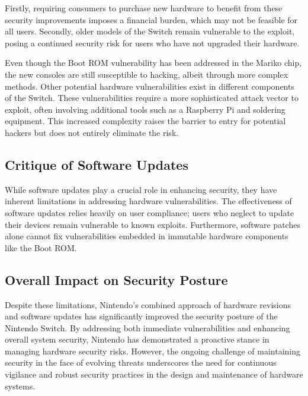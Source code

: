 Firstly, requiring consumers to purchase new hardware to benefit from these security improvements imposes a financial burden, which may not be feasible for all users. Secondly, older models of the Switch remain vulnerable to the exploit, posing a continued security risk for users who have not upgraded their hardware.

Even though the Boot ROM vulnerability has been addressed in the Mariko chip, the new consoles are still susceptible to hacking, albeit through more complex methods. Other potential hardware vulnerabilities exist in different components of the Switch. These vulnerabilities require a more sophisticated attack vector to exploit, often involving additional tools such as a Raspberry Pi and soldering equipment. This increased complexity raises the barrier to entry for potential hackers but does not entirely eliminate the risk.


\subsection{Critique of Software Updates}
While software updates play a crucial role in enhancing security, they have inherent limitations in addressing hardware vulnerabilities. The effectiveness of software updates relies heavily on user compliance; users who neglect to update their devices remain vulnerable to known exploits. Furthermore, software patches alone cannot fix vulnerabilities embedded in immutable hardware components like the Boot ROM.
\subsection{Overall Impact on Security Posture}
Despite these limitations, Nintendo's combined approach of hardware revisions and software updates has significantly improved the security posture of the Nintendo Switch. By addressing both immediate vulnerabilities and enhancing overall system security, Nintendo has demonstrated a proactive stance in managing hardware security risks. However, the ongoing challenge of maintaining security in the face of evolving threats underscores the need for continuous vigilance and robust security practices in the design and maintenance of hardware systems.